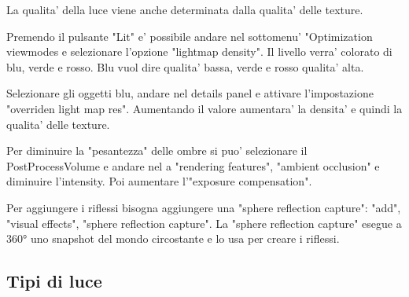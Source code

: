             La qualita' della luce viene anche determinata dalla qualita' delle texture.

            Premendo il pulsante "Lit" e' possibile andare nel sottomenu' "Optimization viewmodes e selezionare l'opzione "lightmap density".
            Il livello verra' colorato di blu, verde e rosso. Blu vuol dire qualita' bassa, verde e rosso qualita' alta.

            Selezionare gli oggetti blu, andare nel details panel e attivare l'impostazione "overriden light map res".
            Aumentando il valore aumentara' la densita' e quindi la qualita' delle texture.

            Per diminuire la "pesantezza" delle ombre si puo' selezionare il PostProcessVolume e andare nel a "rendering features", "ambient occlusion" e diminuire l'intensity. Poi aumentare l'"exposure compensation".

            Per aggiungere i riflessi bisogna aggiungere una "sphere reflection capture": "add", "visual effects", "sphere reflection capture".
            La "sphere reflection capture" esegue a 360° uno snapshot del mondo circostante e lo usa per creare i riflessi.


        \subsection{Tipi di luce}

